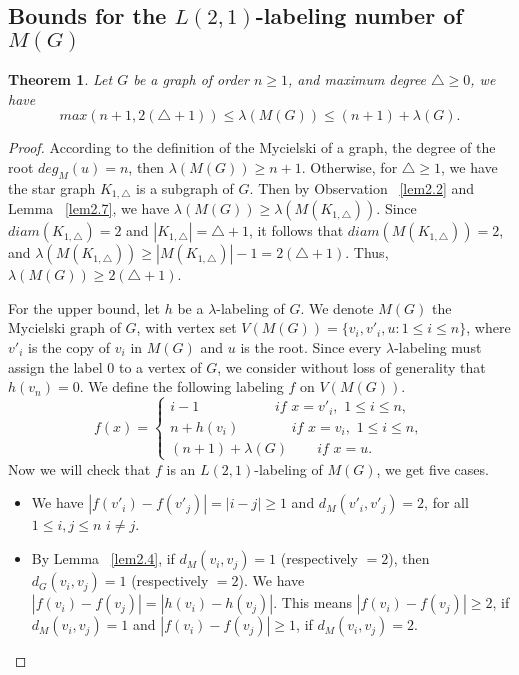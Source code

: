 \documentclass{article}
\newtheorem{theorem} {Theorem}
\newtheorem{open problem} {Open Problem}
\numberwithin{lemma}{section}
\numberwithin{theorem}{section}
\numberwithin{cor}{section}
\numberwithin{prop}{section}
\numberwithin{con}{section}
\numberwithin{claim}{section}
\numberwithin{obs}{section}
\numberwithin{dnt}{section}
\begin{document}
\subsection{Bounds for the $L(2,1)$-labeling number of $M(G)$}
\begin{theorem}\label{th3.1}
	Let $G$ be a graph of order $n\geq 1$,  and maximum degree $\bigtriangleup\geq 0$, we have 
	$$max(n+1, 2(\bigtriangleup+1)) \leq \lambda(M (G))\leq (n+1)+\lambda(G).$$
\end{theorem}
\begin{proof}
	According to the definition of the Mycielski of a graph, the degree of the root $deg_M(u)=n$, then  $\lambda(M(G))\geq n+1$. Otherwise, for $\bigtriangleup\geq 1$, we have the star graph $K_{1,\bigtriangleup}$ is a subgraph of $G$. Then by Observation ~\ref{lem2.2} and Lemma ~\ref{lem2.7}, we have  $ \lambda(M (G))\geq \lambda(M (K_{1,\bigtriangleup}))$. Since $diam(K_{1,\bigtriangleup})=2$ and $|K_{1,\bigtriangleup}|= \bigtriangleup+1$, it follows that $diam(M(K_{1,\bigtriangleup}))=2$, and $ \lambda(M (K_{1,\bigtriangleup}))\geq |M(K_{1,\bigtriangleup})|-1 =2(\bigtriangleup+1)$. Thus, $ \lambda(M (G))\geq 2(\bigtriangleup+1)$. 
	\par For the upper bound, let $h$ be a  $\lambda$-labeling of $G$. We denote $M (G)$ the Mycielski graph of $G$, with vertex set $V(M(G))=\{v_i,v'_i,u : 1\leq i \leq n\}$, where  $v'_i$ is the copy of $v_i$ in $M (G)$  and $u$ is the root. Since every $\lambda$-labeling must assign the label $0$ to a vertex of $G$, we consider without loss of generality that
	$h(v_n)=0$. We define the following labeling $f$ on $V(M (G))$.	
	$$ f(x)=\begin{cases}
	i-1 \hspace{65pt}if\,\,  x=v'_i,\,\, 1\leq i \leq n,\\
	n+h(v_i) \hspace{45pt}if\,\,  x=v_i,\,\, 1\leq i \leq n, \\
	(n+1)+\lambda(G) \hspace{25pt}if\,\,  x=u.
	\end{cases}  $$	
	Now we will check that $f$ is an $L(2,1)$-labeling of $M (G)$, we get five cases.
	\begin{itemize}
		\item We have $ |f(v'_i)-f(v'_j)|=|i-j|\geq 1$ and $d_{M }(v'_i,v'_j)=2$, for all  $1\leq i,j\leq n$  $ i \neq j$.
		\item  By Lemma ~\ref{lem2.4}, if $d_{M}(v_i,v_j)=1$  (respectively $=2$), then $ d_G(v_i,v_j)=1$ (respectively $=2$). We have $ |f(v_i)-f(v_j)|=|h(v_i)-h(v_j)|$. This means  $|f(v_i)-f(v_j)|\geq 2$,  if  $ d_{M }(v_i,v_j)=1 $ and  $|f(v_i)-f(v_j)|\geq 1$,  if  $d_{M }(v_i,v_j)=2$.

\end{itemize}
\end{proof}
\end{document}
